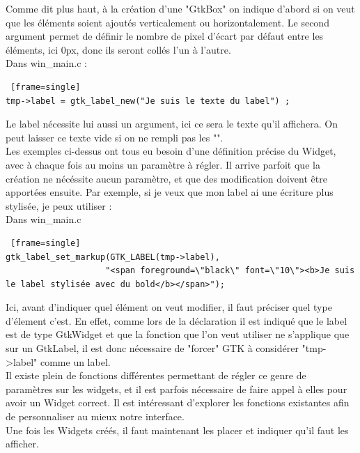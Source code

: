 \documentclass[11pt,french,a4paper]{report}
\begin{document}
Comme dit plus haut, à la création d'une "GtkBox" on indique d'abord si on veut que les éléments soient ajoutés verticalement 
ou horizontalement. Le second argument permet de définir le nombre de pixel d'écart par défaut entre les éléments, 
ici 0px, donc ils seront collés l'un à l'autre.  \\
\small Dans win\_main.c :
\begin{lstlisting} [frame=single]
tmp->label = gtk_label_new("Je suis le texte du label") ; 
\end{lstlisting}
Le label nécessite lui aussi un argument, ici ce sera le texte qu'il affichera. 
On peut laisser ce texte vide si on ne rempli pas les "".  \\
Les exemples ci-dessus ont tous eu besoin d'une définition précise du Widget, avec à chaque fois au moins un paramètre à régler. 
Il arrive parfoit que la création ne nécéssite aucun paramètre, et que des modification doivent être apportées ensuite. 
Par exemple, si je veux que mon label ai une écriture plus stylisée, je peux utiliser :  \\
\small Dans win\_main.c
\begin{lstlisting} [frame=single]
gtk_label_set_markup(GTK_LABEL(tmp->label), 
                    "<span foreground=\"black\" font=\"10\"><b>Je suis le label stylisée avec du bold</b></span>"); 
\end{lstlisting}
Ici, avant d'indiquer quel élément on veut modifier, il faut préciser quel type d'élement c'est.
En effet, comme lors de la déclaration il est indiqué que le label est de type GtkWidget et que la fonction que l'on veut utiliser 
ne s'applique que sur un GtkLabel, il est donc nécessaire de "forcer" GTK à considérer "tmp->label" comme un label.\\
Il existe plein de fonctions différentes permettant de régler ce genre de paramètres sur les widgets, et il est parfois nécessaire 
de faire appel à elles pour avoir un Widget correct. 
Il est intéressant d'explorer les fonctions existantes afin de personnaliser au mieux notre interface. \\
Une fois les Widgets créés, il faut maintenant les placer et indiquer qu'il faut les afficher. \\ 
\end{document}

